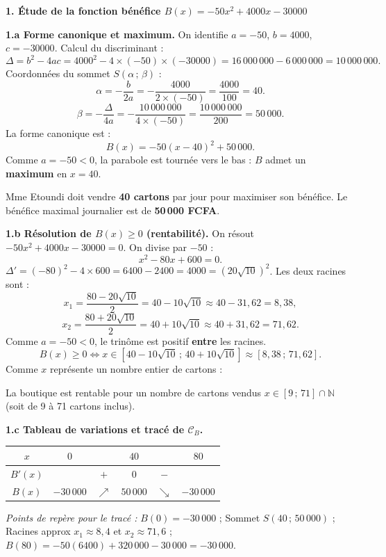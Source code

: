 \documentclass[11pt]{article}
\newcounter{popsec}
\newcounter{popsub}
\newcommand{\courssub}[1]{%
  \stepcounter{popsub}%
  \par\vspace{9pt}\noindent{\popxbold\fontsize{11.5}{13}\selectfont\color{popink}{\color{poporange}\thepopsec.\thepopsub}\hspace{6pt}#1}\par\nopagebreak\vspace{4pt}
}
\begin{document}
\courssub{Démarche et corrigé commenté}
\begin{exoresolu}
\textbf{1. Étude de la fonction bénéfice $B(x) = -50x^2 + 4000x - 30000$}

\noindent \textbf{1.a Forme canonique et maximum.}
On identifie $a = -50$, $b = 4000$, $c = -30000$.
Calcul du discriminant :
\[
\Delta = b^2 - 4ac = 4000^2 - 4\times(-50)\times(-30000) = 16\,000\,000 - 6\,000\,000 = 10\,000\,000.
\]
Coordonnées du sommet $S(\alpha\,;\, \beta)$ :
\[
\alpha = -\frac{b}{2a} = -\frac{4000}{2\times(-50)} = \frac{4000}{100} = 40.
\]
\[
\beta = -\frac{\Delta}{4a} = -\frac{10\,000\,000}{4\times(-50)} = \frac{10\,000\,000}{200} = 50\,000.
\]
La forme canonique est :
\[
\boxed{B(x) = -50(x - 40)^2 + 50\,000}.
\]
Comme $a = -50 < 0$, la parabole est tournée vers le bas : $B$ admet un \textbf{maximum} en $x = 40$.
\begin{aretenir}[Résultat]
Mme Etoundi doit vendre \textbf{40 cartons} par jour pour maximiser son bénéfice.
Le bénéfice maximal journalier est de \textbf{50\,000 FCFA}.
\end{aretenir}

\noindent \textbf{1.b Résolution de $B(x) \ge 0$ (rentabilité).}
On résout $-50x^2 + 4000x - 30000 = 0$. On divise par $-50$ :
\[
x^2 - 80x + 600 = 0.
\]
$\Delta' = (-80)^2 - 4\times 600 = 6400 - 2400 = 4000 = (20\sqrt{10})^2$.
Les deux racines sont :
\[
x_1 = \frac{80 - 20\sqrt{10}}{2} = 40 - 10\sqrt{10} \approx 40 - 31,62 = 8,38,
\]
\[
x_2 = \frac{80 + 20\sqrt{10}}{2} = 40 + 10\sqrt{10} \approx 40 + 31,62 = 71,62.
\]
Comme $a = -50 < 0$, le trinôme est positif \textbf{entre} les racines.
\[
B(x) \ge 0 \iff x \in [40 - 10\sqrt{10}\,;\, 40 + 10\sqrt{10}] \approx [8,38\,;\, 71,62].
\]
Comme $x$ représente un nombre entier de cartons :
\begin{aretenir}
La boutique est rentable pour un nombre de cartons vendus $x \in [9\,;\, 71] \cap \mathbb{N}$ (soit de 9 à 71 cartons inclus).
\end{aretenir}

\noindent \textbf{1.c Tableau de variations et tracé de $\mathcal{C}_B$.}
\begin{center}
\begin{tabular}{|c|ccccc|}\hline
$x$ & $0$ & & $40$ & & $80$ \\ \hline
$B'(x)$ & & $+$ & $0$ & $-$ & \\ \hline
$B(x)$ & $-30\,000$ & $\nearrow$ & $50\,000$ & $\searrow$ & $-30\,000$ \\ \hline
\end{tabular}
\end{center}
\emph{Points de repère pour le tracé :} $B(0)=-30\,000$ ; Sommet $S(40\,;\,50\,000)$ ; Racines approx $x_1 \approx 8,4$ et $x_2 \approx 71,6$ ; $B(80) = -50(6400) + 320\,000 - 30\,000 = -30\,000$.


\end{exoresolu}
\end{document}
